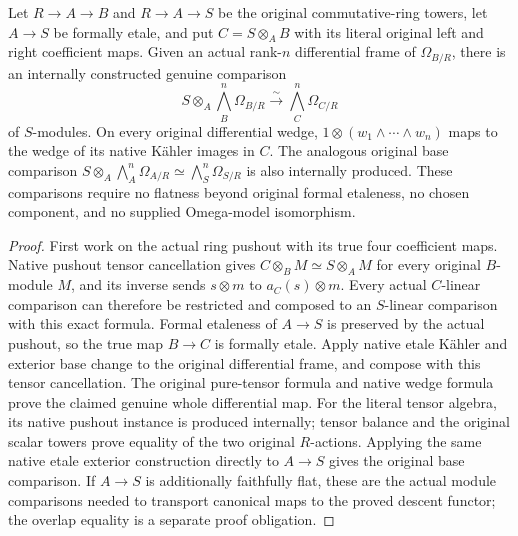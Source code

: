 \begin{theorem}
\label{thm:kn-nadel-canonical-tensor-omega}
\leanok
{}
Let $R\to A\to B$ and $R\to A\to S$ be the original commutative-ring
towers, let $A\to S$ be formally etale, and put $C=S\otimes_A B$ with
its literal original left and right coefficient maps.  Given an actual
rank-$n$ differential frame of $\Omega_{B/R}$, there is an internally
constructed genuine comparison
\[
 S\otimes_A\bigwedge_B^n\Omega_{B/R}
   \xrightarrow{\sim}\bigwedge_C^n\Omega_{C/R}
\]
of $S$-modules.  On every original differential wedge, $1\otimes
(w_1\wedge\cdots\wedge w_n)$ maps to the wedge of its native
K\"ahler images in $C$.  The analogous original base comparison
$S\otimes_A\bigwedge_A^n\Omega_{A/R}\simeq
\bigwedge_S^n\Omega_{S/R}$ is also internally produced.
These comparisons require no flatness beyond original formal etaleness,
no chosen component, and no supplied Omega-model isomorphism.
\end{theorem}
\begin{proof}
First work on the actual ring pushout with its true four coefficient
maps.  Native pushout tensor cancellation gives
$C\otimes_B M\simeq S\otimes_A M$ for every original $B$-module
$M$, and its inverse sends $s\otimes m$ to $a_C(s)\otimes m$.
Every actual $C$-linear comparison can therefore be restricted and
composed to an $S$-linear comparison with this exact formula.
Formal etaleness of $A\to S$ is preserved by the actual pushout,
so the true map $B\to C$ is formally etale.  Apply native etale
K\"ahler and exterior base change to the original differential frame,
and compose with this tensor cancellation.  The original pure-tensor
formula and native wedge formula prove the claimed genuine
whole differential map.  For the literal tensor algebra, its native
pushout instance is produced internally; tensor balance and the
original scalar towers prove equality of the two original $R$-actions.
Applying the same native etale exterior construction directly to
$A\to S$ gives the original base comparison.  If $A\to S$ is
additionally faithfully flat, these are the actual module comparisons
needed to transport canonical maps to the proved descent
functor; the overlap equality is a separate proof obligation.
\end{proof}

